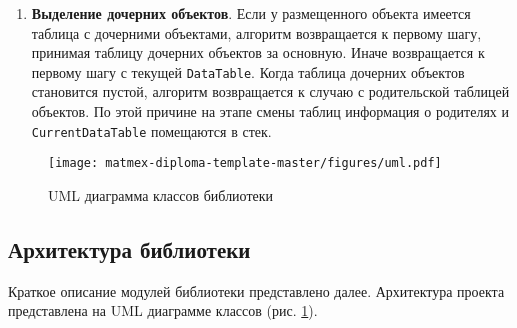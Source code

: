 \begin{enumerate}
    \item \textbf{Выделение дочерних объектов}. Если у размещенного объекта имеется таблица с дочерними объектами, алгоритм возвращается к первому шагу, принимая таблицу дочерних объектов за основную. Иначе возвращается к первому шагу с текущей \texttt{DataTable}. Когда таблица дочерних объектов становится пустой, алгоритм возвращается к случаю с родительской таблицей объектов. По этой причине на этапе смены таблиц информация о родителях и \texttt{CurrentDataTable} помещаются в стек.
    
\end{enumerate}

\begin{figure}
    \centering
    \texttt{[image: matmex-diploma-template-master/figures/uml.pdf]}
    \caption{UML диаграмма классов библиотеки}
    \label{fig:uml}
\end{figure}

\subsection{Архитектура библиотеки}

Краткое описание модулей библиотеки представлено далее. Архитектура проекта представлена на UML диаграмме классов (рис. \ref{fig:uml}). 

